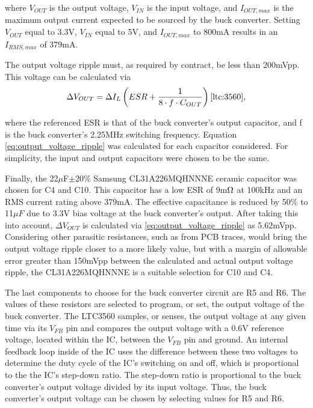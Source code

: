 where $V_{OUT}$ is the output voltage, $V_{IN}$ is the input voltage, and $I_{OUT,max}$ is the maximum output current expected to be sourced by the buck converter. Setting $V_{OUT}$ equal to 3.3V, $V_{IN}$ equal to 5V, and $I_{OUT,max}$ to 800mA results in an $I_{RMS,max}$ of 379mA. 

The output voltage ripple must, as required by contract, be less than 200mVpp. This voltage can be calculated via 
\begin{equation}
\label{eq:output_voltage_ripple}
    {\Delta}V_{OUT} = {\Delta}I_{L}\left(ESR + \frac{1}{8\cdot f \cdot C_{OUT}} \right) \cite{ltc:3560},
\end{equation}

where the referenced ESR is that of the buck converter's output capacitor, and f is the buck converter's 2.25MHz switching frequency. Equation \ref{eq:output_voltage_ripple} was calculated for each capacitor considered. For simplicity, the input and output capacitors were chosen to be the same.

Finally, the 22$\mu$F$\pm$20\% Samsung CL31A226MQHNNNE ceramic capacitor was chosen for C4 and C10. This capacitor has a low ESR of 9m$\ohm$ at 100kHz and an RMS current rating above 379mA. The effective capacitance is reduced by 50\% to 11$\mu{F}$ due to 3.3V bias voltage at the buck converter's output. After taking this into account, ${\Delta}V_{OUT}$ is calculated via \ref{eq:output_voltage_ripple} as 5.62mVpp. Considering other parasitic resistances, such as from PCB traces, would bring the output voltage ripple closer to a more likely value, but with a margin of allowable error greater than 150mVpp between the calculated and actual output voltage ripple, the CL31A226MQHNNNE is a suitable selection for C10 and C4. 


The last components to choose for the buck converter circuit are R5 and R6. The values of these resistors are selected to program, or set, the output voltage of the buck converter. The LTC3560 samples, or senses, the output voltage at any given time via its $V_{FB}$ pin and compares the output voltage with a 0.6V reference voltage, located within the IC, between the $V_{FB}$ pin and ground. An internal feedback loop inside of the IC uses the difference between these two voltages to determine the duty cycle of the IC's switching on and off, which is proportional to the the IC's step-down ratio. The step-down ratio is proportional to the buck converter's output voltage divided by its input voltage. Thus, the buck converter's output voltage can be chosen by selecting values for R5 and R6.


